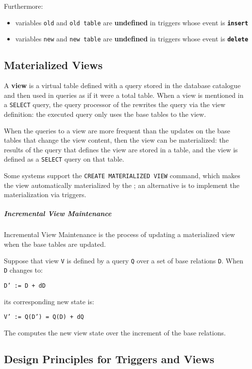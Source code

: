 \documentclass[english]{article}
\begin{document}
Furthermore:

\begin{itemize}
  \item variables \texttt{old} and \texttt{old table} are \textbf{undefined} in triggers whose event is \textbf{\texttt{insert}}
  \item variables \texttt{new} and \texttt{new table} are \textbf{undefined} in triggers whose event is \textbf{\texttt{delete}}
\end{itemize}

\subsection{Materialized Views}

A \textbf{view} is a virtual table defined with a query stored in the database catalogue and then used in queries as if it were a total table.
When a view is mentioned in a \texttt{SELECT} query, the query processor of the \dbms rewrites the query via the view definition:
the executed query only uses the base tables to the view.

When the queries to a view are more frequent than the updates on the base tables that change the view content, then the view can be materialized:
the results of the query that defines the view are stored in a table, and the view is defined as a \texttt{SELECT} query on that table.

Some systems support the \texttt{CREATE MATERIALIZED VIEW} command, which makes the view automatically materialized by the \dbms;
an alternative is to implement the materialization via triggers.

\subparagraph*{Incremental View Maintenance}
Incremental View Maintenance is the process of updating a materialized view when the base tables are updated.

Suppose that view \texttt{V} is defined by a query \texttt{Q} over a set of base relations \texttt{D}.
When \texttt{D} changes to:
\begin{center}
  \texttt{D' := D + dD}
\end{center}
its corresponding new state is:
\begin{center}
  \texttt{V' := Q(D') = Q(D) + dQ}
\end{center}
The \dbms computes the new view state over the increment of the base relations.

\subsection{Design Principles for Triggers and Views}
\end{document}

